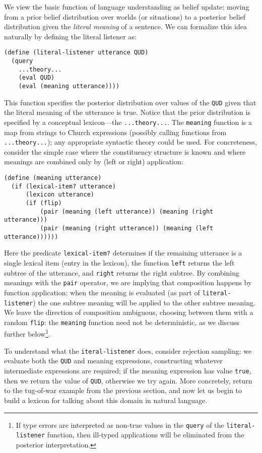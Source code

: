 \documentclass[12pt]{article}
\begin{document}
We view the basic function of language understanding as belief update: moving from a prior belief distribution over worlds (or situations) to a posterior belief distribution given the \emph{literal meaning} of a sentence. We can formalize this idea naturally by defining the literal listener as:
\begin{lstlisting}
(define (literal-listener utterance QUD)
  (query
    ...theory...
    (eval QUD)
    (eval (meaning utterance))))
\end{lstlisting}
This function specifies the posterior distribution over values of the \lstinline{QUD} given that the literal meaning of the utterance is true.  Notice that the prior distribution is specified by a conceptual lexicon---the \lstinline{...theory...}. The \lstinline{meaning} function is a map from strings to Church expressions (possibly calling functions from \lstinline{...theory...}); any appropriate syntactic theory could be used. For concreteness, consider the simple case where the constituency structure is known and where meanings are combined only by (left or right) application:
\begin{lstlisting}
(define (meaning utterance)
  (if (lexical-item? utterance)
      (lexicon utterance)
      (if (flip)
          (pair (meaning (left utterance)) (meaning (right utterance)))
          (pair (meaning (right utterance)) (meaning (left utterance))))))
\end{lstlisting}  
Here the predicate \lstinline{lexical-item?} determines if the remaining utterance is a single lexical item (entry in the lexicon), the function \lstinline{left} returns the left subtree of the utterance, and \lstinline{right} returns the right subtree. By combining meanings with the \lstinline{pair} operator, we are implying that composition happens by function application: when the meaning is evaluated (as part of \lstinline{literal-listener}) the one subtree meaning will be applied to the other subtree meaning. We leave the direction of composition ambiguous, choosing between them with a random \lstinline{flip}: the \lstinline{meaning} function need not be deterministic, as we discuss further below\footnote{If type errors are interpreted as non-true values in the \lstinline{query} of the \lstinline{literal-listener} function, then ill-typed applications will be eliminated from the posterior interpretation.}.

To understand what the \lstinline{iteral-listener} does, consider rejection sampling: we evaluate both the \lstinline{QUD} and meaning expressions, constructing whatever intermediate expressions are required; if the meaning expression has value \lstinline{true}, then we return the value of \lstinline{QUD}, otherwise we try again. More concretely, return to the tug-of-war example from the previous section, and now let us begin to build a lexicon for talking about this domain in natural language. 
\end{document}
